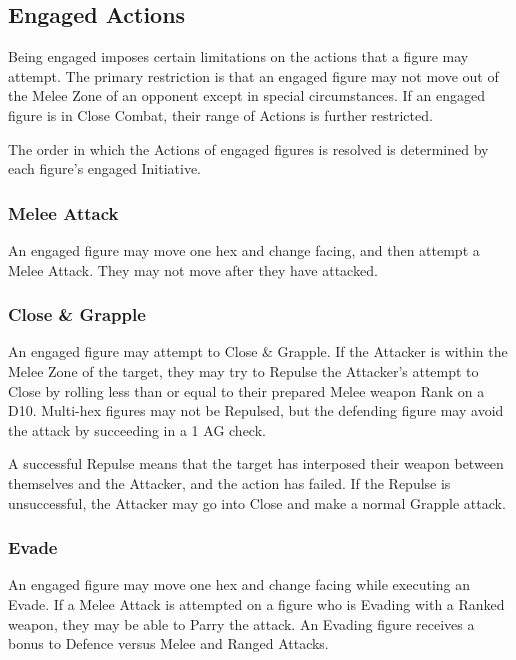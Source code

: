 \begin{multicols*}{3}
\subsection{Engaged Actions}
\label{combat:engaged}

Being engaged imposes certain limitations on the actions that a figure
may attempt. The primary restriction is that an engaged figure may not
move out of the Melee Zone of an opponent except in special
circumstances. If an engaged figure is in Close Combat, their range of
Actions is further restricted.

The order in which the Actions of engaged figures is resolved is
determined by each figure's engaged Initiative.

\subsubsection{Melee Attack}

An engaged figure may move one hex and change facing, and then attempt
a Melee Attack. They may not move after they have attacked.

\subsubsection{Close \& Grapple}

An engaged figure may attempt to Close \& Grapple. If the Attacker is
within the Melee Zone of the target, they may try to Repulse the
Attacker's attempt to Close by rolling less than or equal to their
prepared Melee weapon Rank on a D10. Multi-hex figures may not be
Repulsed, but the defending figure may avoid the attack by succeeding
in a 1 \x AG check.

A successful Repulse means that the target has interposed their weapon
between themselves and the Attacker, and the action has failed. If the
Repulse is unsuccessful, the Attacker may go into Close and make a
normal Grapple attack.

\subsubsection{Evade}

An engaged figure may move one hex and change facing while executing
an Evade. If a Melee Attack is attempted on a figure who is Evading
with a Ranked weapon, they may be able to Parry the attack. An Evading
figure receives a bonus to Defence versus Melee and Ranged Attacks.


\end{multicols*}
